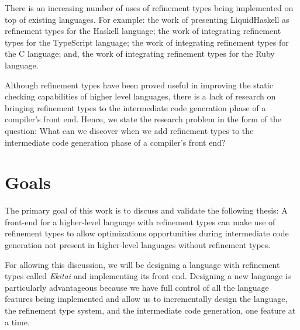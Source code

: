 \documentclass[
  oneside,
  english,
  coorientadorbanca,
  noabntexcite
]{ufsc-thesis-rn46-2019}
\begin{document}
There is an increasing number of uses of refinement types being implemented on top of existing languages.
For example: the work of \textcite{vazou2014liquidhaskell} presenting LiquidHaskell as refinement types for the Haskell language; the work of \textcite{vekris2016refinementtypescript} integrating refinement types for the TypeScript language; the work of \textcite{sammler2021refinedc} integrating refinement types for the C language; and, the work of \textcite{vazou2018refinementruby} integrating refinement types for the Ruby language.

Although refinement types have been proved useful in improving the static checking capabilities of higher level languages, there is a lack of research on bringing refinement types to the intermediate code generation phase of a compiler's front end.
Hence, we state the research problem in the form of the question: What can we discover when we add refinement types to the intermediate code generation phase of a compiler's front end?

\section{Goals}\label{chapter:introduction:sec:goals}

The primary goal of this work is to discuss and validate the following thesis: A front-end for a higher-level language with refinement types can make use of refinement types to allow optimizations opportunities during intermediate code generation not present in higher-level languages without refinement types.

For allowing this discussion, we will be designing a language with refinement types called \textit{Ekitai} and implementing its front end.
Designing a new language is particularly advantageous because we have full control of all the language features being implemented and allow us to incrementally design the language, the refinement type system, and the intermediate code generation, one feature at a time.
\end{document}
